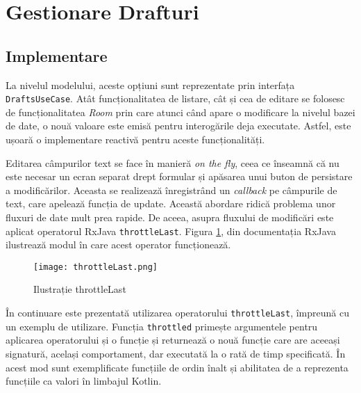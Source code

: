 \section{Gestionare Drafturi}

\subsection{Implementare}

La nivelul modelului, aceste opțiuni sunt reprezentate prin interfața \texttt{DraftsUseCase}. Atât funcționalitatea de listare, cât și cea de editare se folosesc de funcționalitatea \emph{Room} prin care atunci când apare o modificare la nivelul bazei de date, o nouă valoare este emisă pentru interogările deja executate. Astfel, este ușoară o implementare reactivă pentru aceste funcționalități.



Editarea câmpurilor text se face în manieră \emph{on the fly}, ceea ce înseamnă că nu este necesar un ecran separat drept formular și apăsarea unui buton de persistare a modificărilor. Aceasta se realizează înregistrând un \emph{callback} pe câmpurile de text, care apelează funcția de update. Această abordare ridică problema unor fluxuri de date mult prea rapide. De aceea, asupra fluxului de modificări este aplicat operatorul RxJava \texttt{throttleLast}. Figura \ref{fig:throttle}, din documentația RxJava \cite{ThrottleLast} ilustrează modul în care acest operator funcționează.

\begin{figure}[h]
  \centering
  \texttt{[image: throttleLast.png]}
  \caption{Ilustrație throttleLast}
  \label{fig:throttle}
\end{figure}

În continuare este prezentată utilizarea operatorului \texttt{throttleLast}, împreună cu un exemplu de utilizare. Funcția \texttt{throttled} primește argumentele pentru aplicarea operatorului și o funcție și returnează o nouă funcție care are aceeași signatură, același comportament, dar executată la o rată de timp specificată. În acest mod sunt exemplificate funcțiile de ordin înalt și abilitatea de a reprezenta funcțiile ca valori în limbajul Kotlin.



